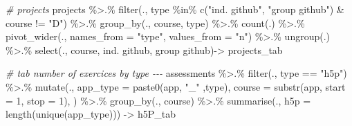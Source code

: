 \documentclass[
]{article}
\newenvironment{Shaded}{\begin{snugshade}}{\end{snugshade}}
\newcommand{\AttributeTok}[1]{\textcolor[rgb]{0.77,0.63,0.00}{#1}}
\newcommand{\CommentTok}[1]{\textcolor[rgb]{0.56,0.35,0.01}{\textit{#1}}}
\newcommand{\DecValTok}[1]{\textcolor[rgb]{0.00,0.00,0.81}{#1}}
\newcommand{\FunctionTok}[1]{\textcolor[rgb]{0.00,0.00,0.00}{#1}}
\newcommand{\NormalTok}[1]{#1}
\newcommand{\OtherTok}[1]{\textcolor[rgb]{0.56,0.35,0.01}{#1}}
\newcommand{\SpecialCharTok}[1]{\textcolor[rgb]{0.00,0.00,0.00}{#1}}
\newcommand{\StringTok}[1]{\textcolor[rgb]{0.31,0.60,0.02}{#1}}
\begin{document}
\begin{Shaded}
\begin{Highlighting}[]
\CommentTok{\# projects}
\NormalTok{projects }\SpecialCharTok{\%\textgreater{}.\%}
  \FunctionTok{filter}\NormalTok{(., type }\SpecialCharTok{\%in\%} \FunctionTok{c}\NormalTok{(}\StringTok{"ind. github"}\NormalTok{, }\StringTok{"group github"}\NormalTok{) }\SpecialCharTok{\&}\NormalTok{ course }\SpecialCharTok{!=} \StringTok{"D"}\NormalTok{) }\SpecialCharTok{\%\textgreater{}.\%}
  \FunctionTok{group\_by}\NormalTok{(., course, type) }\SpecialCharTok{\%\textgreater{}.\%}
  \FunctionTok{count}\NormalTok{(.) }\SpecialCharTok{\%\textgreater{}.\%}
  \FunctionTok{pivot\_wider}\NormalTok{(., }\AttributeTok{names\_from =} \StringTok{"type"}\NormalTok{, }\AttributeTok{values\_from =} \StringTok{"n"}\NormalTok{) }\SpecialCharTok{\%\textgreater{}.\%}
  \FunctionTok{ungroup}\NormalTok{(.) }\SpecialCharTok{\%\textgreater{}.\%}
  \FunctionTok{select}\NormalTok{(., course, }\StringTok{\textasciigrave{}}\AttributeTok{ind. github}\StringTok{\textasciigrave{}}\NormalTok{, }\StringTok{\textasciigrave{}}\AttributeTok{group github}\StringTok{\textasciigrave{}}\NormalTok{)}\OtherTok{{-}\textgreater{}}\NormalTok{ projects\_tab}
    
\CommentTok{\# tab number of exercices by type {-}{-}{-}}
\NormalTok{assessments }\SpecialCharTok{\%\textgreater{}.\%}
  \FunctionTok{filter}\NormalTok{(., type }\SpecialCharTok{==} \StringTok{"h5p"}\NormalTok{) }\SpecialCharTok{\%\textgreater{}.\%}
  \FunctionTok{mutate}\NormalTok{(., }
    \AttributeTok{app\_type =} \FunctionTok{paste0}\NormalTok{(app, }\StringTok{"\_"}\NormalTok{ ,}\StringTok{\textquotesingle{}type\textquotesingle{}}\NormalTok{),}
    \AttributeTok{course =} \FunctionTok{substr}\NormalTok{(app, }\AttributeTok{start =} \DecValTok{1}\NormalTok{, }\AttributeTok{stop =} \DecValTok{1}\NormalTok{),}
\NormalTok{    ) }\SpecialCharTok{\%\textgreater{}.\%}
  \FunctionTok{group\_by}\NormalTok{(., course) }\SpecialCharTok{\%\textgreater{}.\%}
  \FunctionTok{summarise}\NormalTok{(., }\AttributeTok{h5p =} \FunctionTok{length}\NormalTok{(}\FunctionTok{unique}\NormalTok{(app\_type))) }\OtherTok{{-}\textgreater{}}\NormalTok{ h5P\_tab}


\end{Highlighting}
\end{Shaded}
\end{document}
